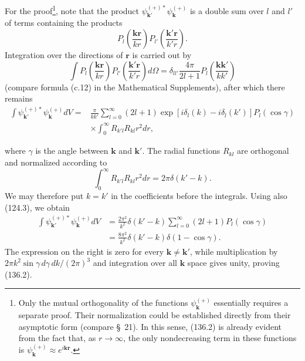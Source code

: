 For the proof\footnote{Only the mutual orthogonality of the functions
$\psi_{\mathbf k}^{(+)}$ essentially requires a separate proof. Their
normalization could be established directly from their asymptotic form
(compare \S~21). In this sense, (136.2) is already evident from the fact that,
as $r\to\infty$, the only nondecreasing term in these functions is
$\psi_{\mathbf k}^{(+)}\approx e^{i\mathbf{kr}}$.}, note that the product
$\psi_{\mathbf k'}^{(+)*}\psi_{\mathbf k}^{(+)}$ is a double sum over $l$ and
$l'$ of terms containing the products
\[
 P_l\left(\frac{\mathbf{kr}}{kr}\right)P_{l'}\left(\frac{\mathbf{k'r}}{k'r}\right).
\]
Integration over the directions of $\mathbf r$ is carried out by
\begin{equation}
 \int P_l\left(\frac{\mathbf{kr}}{kr}\right)P_{l'}\left(\frac{\mathbf{k'r}}{k'r}\right)d\Omega
 =\delta_{ll'}\frac{4\pi}{2l+1}P_l\left(\frac{\mathbf{kk'}}{kk'}\right)
 \tag{136.3}
\end{equation}
(compare formula (c.12) in the Mathematical Supplements), after which there
remains
\begin{align*}
 \int\psi_{\mathbf k'}^{(+)*}\psi_{\mathbf k}^{(+)}dV
 ={}&\frac{\pi}{kk'}\sum_{l=0}^{\infty}(2l+1)
 \exp[i\delta_l(k)-i\delta_l(k')]P_l(\cos\gamma)\\
 &\times\int_0^\infty R_{k'l}R_{kl}r^2dr,
\end{align*}

where $\gamma$ is the angle between $\mathbf k$ and $\mathbf k'$. The radial
functions $R_{kl}$ are orthogonal and normalized according to
\[
 \int_0^\infty R_{k'l}R_{kl}r^2dr=2\pi\delta(k'-k).
\]
We may therefore put $k=k'$ in the coefficients before the integrals. Using
also (124.3), we obtain
\begin{align*}
 \int\psi_{\mathbf k'}^{(+)*}\psi_{\mathbf k}^{(+)}dV
 &=\frac{2\pi^2}{k^2}\delta(k'-k)
 \sum_{l=0}^{\infty}(2l+1)P_l(\cos\gamma)\\
 &=\frac{8\pi^2}{k^2}\delta(k'-k)\delta(1-\cos\gamma).
\end{align*}
The expression on the right is zero for every
$\mathbf k\ne\mathbf k'$, while multiplication by
$2\pi k^2\sin\gamma\,d\gamma\,dk/(2\pi)^3$ and integration over all
$\mathbf k$ space gives unity, proving (136.2).

